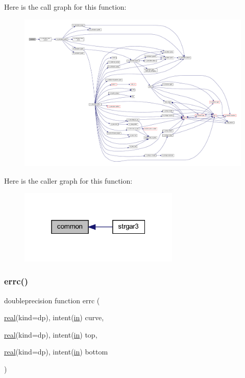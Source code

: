 Here is the call graph for this function\+:
\nopagebreak
\begin{figure}[H]
\begin{center}
\leavevmode
\includegraphics[width=350pt]{strgar3_8f90_a96cfa8fe4e730b87185eb5629575c039_cgraph}
\end{center}
\end{figure}
Here is the caller graph for this function\+:
\nopagebreak
\begin{figure}[H]
\begin{center}
\leavevmode
\includegraphics[width=217pt]{strgar3_8f90_a96cfa8fe4e730b87185eb5629575c039_icgraph}
\end{center}
\end{figure}
\mbox{\label{strgar3_8f90_adec4c296d118e928067278d0eda4d60c}} 
\subsubsection{\texorpdfstring{errc()}{errc()}}
{\footnotesize\ttfamily doubleprecision function errc (\begin{DoxyParamCaption}\item[{\hyperlink{read__watch_83_8txt_abdb62bde002f38ef75f810d3a905a823}{real}(kind=dp), intent(\hyperlink{M__journal_83_8txt_afce72651d1eed785a2132bee863b2f38}{in})}]{curve,  }\item[{\hyperlink{read__watch_83_8txt_abdb62bde002f38ef75f810d3a905a823}{real}(kind=dp), intent(\hyperlink{M__journal_83_8txt_afce72651d1eed785a2132bee863b2f38}{in})}]{top,  }\item[{\hyperlink{read__watch_83_8txt_abdb62bde002f38ef75f810d3a905a823}{real}(kind=dp), intent(\hyperlink{M__journal_83_8txt_afce72651d1eed785a2132bee863b2f38}{in})}]{bottom }\end{DoxyParamCaption})}

